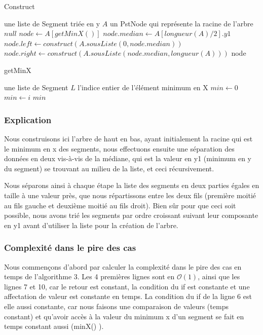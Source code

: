 \documentclass[10pt,a4paper]{article}
\begin{document}
\begin{algorithm}
\caption{Construct}
\begin{algorithmic}[1]
\REQUIRE une liste de Segment triée en y $A$ 
\ENSURE un PstNode qui représente la racine de l'arbre
\RETURN $null$
\ENDIF
\STATE $node \leftarrow A[getMinX()] $
\STATE $node.median \leftarrow A[longueur(A)/2].y1 $
\STATE $node.left \leftarrow construct(A.sousListe(0,node.median)) $
\STATE $node.right \leftarrow construct(A.sousListe(node.median,longueur(A))) $
\ENDIF
\RETURN node
\end{algorithmic}
\end{algorithm}
\newpage
\begin{algorithm}
\caption{getMinX}
\begin{algorithmic}[1]
\REQUIRE une liste de Segment $L$
\ENSURE l'indice entier de l’élément minimum en X
\ENDIF
\STATE $min \leftarrow 0$
\STATE $min \leftarrow i$
\ENDIF
\ENDFOR
\RETURN $min$
\end{algorithmic}
\end{algorithm}

\subsubsection{Explication}

Nous construisons ici l'arbre de haut en bas, ayant initialement la racine qui est le minimum en x des segments, nous effectuons ensuite une séparation des données en deux vis-à-vis de la médiane, qui est la valeur en y1 (minimum en y du segment) se trouvant au milieu de la liste, et ceci récursivement.

Nous séparons ainsi à chaque étape la liste des segments en deux parties égales en taille à une valeur près, que nous répartissons entre les deux fils (première moitié au fils gauche et deuxième moitié au fils droit). Bien sûr pour que ceci soit possible, nous avons trié les segments par ordre croissant suivant leur composante en y1 avant d'utiliser la liste pour la création de l'arbre.

\subsubsection{Complexité dans le pire des cas}
Nous commençons d'abord par calculer la complexité dans le pire des cas en temps de l'algorithme 3.
Les 4 premières lignes sont en $\mathcal{O} (1)$, ainsi que les lignes 7 et 10, car le retour est constant, la condition du if est constante et une affectation de valeur est constante en temps. La condition du if de la ligne 6 est elle aussi constante, car nous faisons une comparaison de valeurs (temps constant) et qu'avoir accès à la valeur du minimum x d'un segment se fait en temps constant aussi (minX() ).
\end{document}
